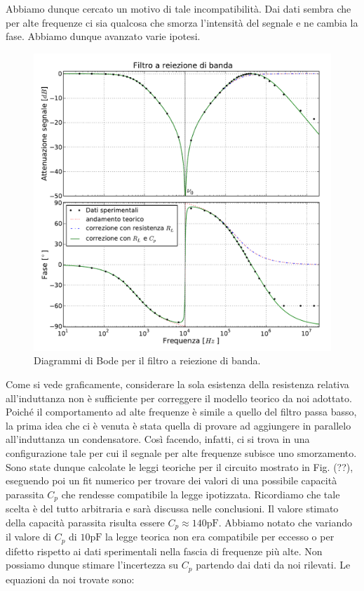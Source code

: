 Abbiamo dunque cercato un motivo di tale incompatibilità. Dai dati sembra che per alte frequenze ci sia qualcosa che smorza l'intensità del segnale e ne cambia la fase. Abbiamo dunque avanzato varie ipotesi.

\begin{figure}
    \includegraphics[width=115mm]{notch.pdf}
    \caption{Diagrammi di Bode per il filtro a reiezione di banda.}
    \label{fig:notch}
\end{figure}

Come si vede graficamente, considerare la sola esistenza della resistenza relativa all'induttanza non è sufficiente per correggere il modello teorico da noi adottato.
Poiché il comportamento ad alte frequenze è simile a quello del filtro passa basso, la prima idea che ci è venuta è stata quella di provare ad aggiungere in parallelo all'induttanza un condensatore. Così facendo, infatti, ci si trova in una configurazione tale per cui il segnale per alte frequenze subisce uno smorzamento. Sono state dunque calcolate le leggi teoriche per il circuito mostrato in Fig. (??), eseguendo poi un fit numerico per trovare dei valori di una possibile capacità parassita $C_p$ che rendesse compatibile la legge ipotizzata. Ricordiamo che tale scelta è del tutto arbitraria e sarà discussa nelle conclusioni. Il valore stimato della capacità parassita risulta essere $C_p \approx 140 \si{\pico\farad}$. Abbiamo notato che variando il valore di $C_p$ di $10 \si{\pico\farad}$ la legge teorica non era compatibile per eccesso o per difetto rispetto ai dati sperimentali nella fascia di frequenze più alte. Non possiamo dunque stimare l'incertezza su $C_p$ partendo dai dati da noi rilevati. Le equazioni da noi trovate sono:

